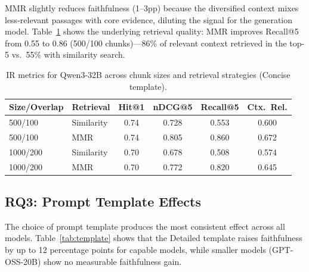 MMR slightly reduces faithfulness (1--3pp) because the diversified context mixes less-relevant passages with core evidence, diluting the signal for the generation model. Table~\ref{tab:ir-metrics} shows the underlying retrieval quality: MMR improves Recall@5 from 0.55 to 0.86 (500/100 chunks)---86\% of relevant context retrieved in the top-5 vs.\ 55\% with similarity search.

\begin{table}[t]
\centering
\caption{IR metrics for Qwen3-32B across chunk sizes and retrieval strategies (Concise template).}
\label{tab:ir-metrics}
\begin{tabular}{llcccc}
\toprule
\textbf{Size/Overlap} & \textbf{Retrieval} & \textbf{Hit@1} & \textbf{nDCG@5} & \textbf{Recall@5} & \textbf{Ctx.\ Rel.} \\
\midrule
500/100  & Similarity & 0.74 & 0.728 & 0.553 & 0.600 \\
500/100  & MMR        & 0.74 & 0.805 & 0.860 & 0.672 \\
1000/200 & Similarity & 0.70 & 0.678 & 0.508 & 0.574 \\
1000/200 & MMR        & 0.70 & 0.772 & 0.820 & 0.645 \\
\bottomrule
\end{tabular}
\end{table}

\subsection{RQ3: Prompt Template Effects}

The choice of prompt template produces the most consistent effect across all models. Table~\ref{tab:template} shows that the Detailed template raises faithfulness by up to 12 percentage points for capable models, while smaller models (GPT-OSS-20B) show no measurable faithfulness gain.

